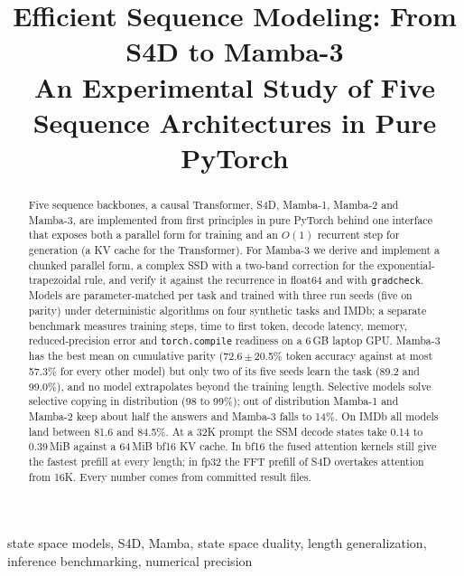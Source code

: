 \documentclass[conference]{IEEEtran}
\newcommand{\mamba}{Mamba}
\begin{document}
\title{Efficient Sequence Modeling: From S4D to \mamba{}-3\\
\large An Experimental Study of Five Sequence Architectures in Pure PyTorch}

\author{
}

\maketitle

\begin{abstract}
Five sequence backbones, a causal Transformer, S4D, \mamba{}-1, \mamba{}-2
and \mamba{}-3, are implemented from first principles in pure PyTorch behind
one interface that exposes both a parallel form for training and an $O(1)$
recurrent step for generation (a KV cache for the Transformer). For
\mamba{}-3 we derive and implement a chunked parallel form, a complex SSD
with a two-band correction for the exponential-trapezoidal rule, and verify
it against the recurrence in float64 and with \texttt{gradcheck}. Models
are parameter-matched per task and trained with three run seeds (five on
parity) under
deterministic algorithms on four synthetic tasks and IMDb; a separate
benchmark measures training steps, time to first token, decode latency,
memory, reduced-precision error and \texttt{torch.compile} readiness on a
6\,GB laptop GPU. \mamba{}-3 has the best mean on cumulative parity
(72.6\,$\pm$\,20.5\% token accuracy against at most 57.3\% for every other
model) but only two of its five seeds learn the task (89.2 and 99.0\%), and no
model extrapolates beyond the training length. Selective models solve
selective copying in distribution (98 to 99\%); out of distribution
\mamba{}-1 and \mamba{}-2 keep about half the answers and \mamba{}-3 falls
to 14\%. On IMDb all models land between 81.6 and 84.5\%. At a 32K prompt
the SSM decode states take 0.14 to 0.39\,MiB against a 64\,MiB bf16 KV
cache. In bf16 the fused attention kernels still give the fastest prefill at
every length; in fp32 the FFT prefill of S4D overtakes attention from 16K.
Every number comes from committed result files.
\end{abstract}

\begin{IEEEkeywords}
state space models, S4D, Mamba, state space duality, length
generalization, inference benchmarking, numerical precision
\end{IEEEkeywords}
\end{document}
